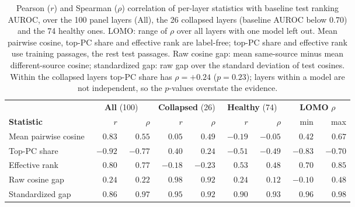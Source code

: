 \begin{table}[t]
\centering
\small
\setlength{\tabcolsep}{5pt}
\begin{tabular}{lrrrrrrrr}
\toprule
& \multicolumn{2}{c}{\textbf{All} (100)} & \multicolumn{2}{c}{\textbf{Collapsed} (26)} & \multicolumn{2}{c}{\textbf{Healthy} (74)} & \multicolumn{2}{c}{\textbf{LOMO} $\rho$} \\
\cmidrule(lr){2-3}\cmidrule(lr){4-5}\cmidrule(lr){6-7}\cmidrule(lr){8-9}
\textbf{Statistic} & $r$ & $\rho$ & $r$ & $\rho$ & $r$ & $\rho$ & min & max \\
\midrule
Mean pairwise cosine & $\phantom{-}0.83$ & $\phantom{-}0.55$ & $\phantom{-}0.05$ & $\phantom{-}0.49$ & $-0.19$ & $-0.05$ & $\phantom{-}0.42$ & $\phantom{-}0.67$ \\
Top-PC share & $-0.92$ & $-0.77$ & $\phantom{-}0.40$ & $\phantom{-}0.24$ & $-0.51$ & $-0.49$ & $-0.83$ & $-0.70$ \\
Effective rank & $\phantom{-}0.80$ & $\phantom{-}0.77$ & $-0.18$ & $-0.23$ & $\phantom{-}0.53$ & $\phantom{-}0.48$ & $\phantom{-}0.70$ & $\phantom{-}0.85$ \\
Raw cosine gap & $\phantom{-}0.24$ & $\phantom{-}0.22$ & $\phantom{-}0.98$ & $\phantom{-}0.92$ & $\phantom{-}0.24$ & $\phantom{-}0.12$ & $-0.10$ & $\phantom{-}0.48$ \\
Standardized gap & $\phantom{-}0.86$ & $\phantom{-}0.97$ & $\phantom{-}0.95$ & $\phantom{-}0.92$ & $\phantom{-}0.90$ & $\phantom{-}0.93$ & $\phantom{-}0.96$ & $\phantom{-}0.98$ \\
\bottomrule
\end{tabular}
\caption{Pearson ($r$) and Spearman ($\rho$) correlation of per-layer statistics with baseline test ranking AUROC, over the 100 panel layers (All), the 26 collapsed layers (baseline AUROC below 0.70) and the 74 healthy ones. LOMO: range of $\rho$ over all layers with one model left out. Mean pairwise cosine, top-PC share and effective rank are label-free; top-PC share and effective rank use training passages, the rest test passages. Raw cosine gap: mean same-source minus mean different-source cosine; standardized gap: raw gap over the standard deviation of test cosines. Within the collapsed layers top-PC share has $\rho=+0.24$ ($p=0.23$); layers within a model are not independent, so the $p$-values overstate the evidence.}
\label{tab:geometry_correlations}
\end{table}
